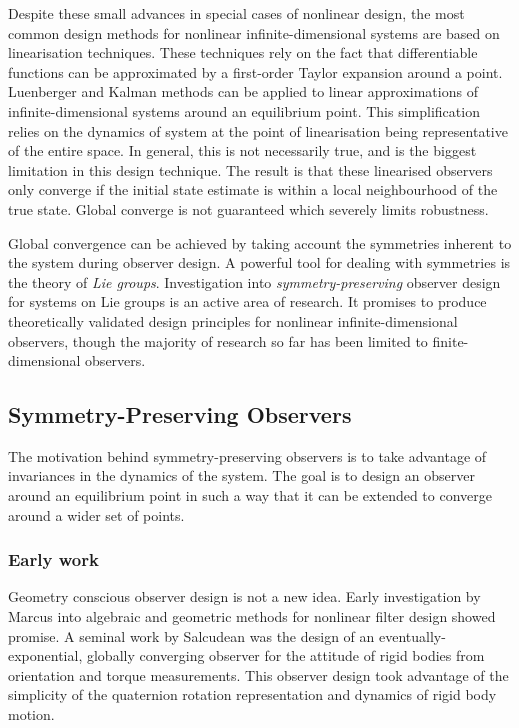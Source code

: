 Despite these small advances in special cases of nonlinear design, the most common design methods for nonlinear infinite-dimensional systems are based on linearisation techniques. These techniques rely on the fact that differentiable functions can be approximated by a first-order Taylor expansion around a point. Luenberger and Kalman methods can be applied to linear approximations of infinite-dimensional systems around an equilibrium point. This simplification relies on the dynamics of system at the point of linearisation being representative of the entire space. In general, this is not necessarily true, and is the biggest limitation in this design technique. The result is that these linearised observers only converge if the initial state estimate is within a local neighbourhood of the true state. Global converge is not guaranteed which severely limits robustness.

Global convergence can be achieved by taking account the symmetries inherent to the system during observer design. A powerful tool for dealing with symmetries is the theory of \textit{Lie groups}. Investigation into \textit{symmetry-preserving} observer design for systems on Lie groups is an active area of research. It promises to produce theoretically validated design principles for nonlinear infinite-dimensional observers, though the majority of research so far has been limited to finite-dimensional observers.

\subsection{Symmetry-Preserving Observers}
The motivation behind symmetry-preserving observers is to take advantage of invariances in the dynamics of the system. The goal is to design an observer around an equilibrium point in such a way that it can be extended to converge around a wider set of points.

\subsubsection{Early work}
Geometry conscious observer design is not a new idea. Early investigation by Marcus \cite{marcus1984algebraic} into algebraic and geometric methods for nonlinear filter design showed promise.
A seminal work by Salcudean \cite{salcudean1991globally} was the design of an eventually-exponential, globally converging observer for the attitude of rigid bodies from orientation and torque measurements. This observer design took advantage of the simplicity of the quaternion rotation representation and dynamics of rigid body motion.

